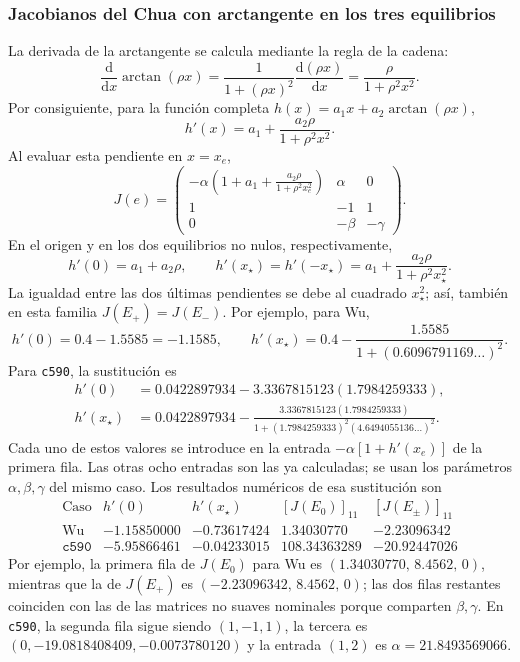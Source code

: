 \subsubsection{Jacobianos del Chua con arctangente en los tres equilibrios}

La derivada de la arctangente se calcula mediante la regla de la cadena:
\[
\frac{\mathrm d}{\mathrm dx}\arctan(\rho x)
=\frac{1}{1+(\rho x)^2}\frac{\mathrm d(\rho x)}{\mathrm dx}
=\frac{\rho}{1+\rho^2x^2}.
\]
Por consiguiente, para la función completa \(h(x)=a_1x+a_2\arctan(\rho x)\),
\[
h'(x)=a_1+\frac{a_2\rho}{1+\rho^2x^2}.
\]
Al evaluar esta pendiente en \(x=x_e\),
\begin{equation}
J(e)=
\begin{pmatrix}
\displaystyle
-\alpha\left(1+a_1+
\frac{a_2\rho}{1+\rho^2x_e^2}\right)
&\alpha&0\\[3mm]
1&-1&1\\
0&-\beta&-\gamma
\end{pmatrix}.
\label{eq:jacobiano_arctan}
\end{equation}
En el origen y en los dos equilibrios no nulos, respectivamente,
\[
h'(0)=a_1+a_2\rho,
\qquad
h'(x_\star)=h'(-x_\star)
=a_1+\frac{a_2\rho}{1+\rho^2x_\star^2}.
\]
La igualdad entre las dos últimas pendientes se debe al cuadrado
\(x_\star^2\); así, también en esta familia \(J(E_+)=J(E_-)\).
Por ejemplo, para Wu,
\[
h'(0)=0.4-1.5585=-1.1585,
\qquad
h'(x_\star)=0.4-
\frac{1.5585}{1+(0.6096791169\ldots)^2}.
\]
Para \texttt{c590}, la sustitución es
\[
\begin{aligned}
h'(0)&=0.0422897934-3.3367815123(1.7984259333),\\
h'(x_\star)&=0.0422897934-
\frac{3.3367815123(1.7984259333)}
{1+(1.7984259333)^2(4.6494055136\ldots)^2}.
\end{aligned}
\]
Cada uno de estos valores se introduce en la entrada
\(-\alpha[1+h'(x_e)]\) de la primera fila. Las otras ocho entradas son las
ya calculadas; se usan los parámetros \(\alpha,\beta,\gamma\) del mismo
caso. Los resultados numéricos de esa sustitución son
\[
\begin{array}{c|rrrr}
\text{Caso}&h'(0)&h'(x_\star)&[J(E_0)]_{11}&[J(E_\pm)]_{11}\\ \hline
\text{Wu}&-1.15850000&-0.73617424&1.34030770&-2.23096342\\
\texttt{c590}&-5.95866461&-0.04233015&108.34363289&-20.92447026
\end{array}
\]
Por ejemplo, la primera fila de \(J(E_0)\) para Wu es
\((1.34030770,\,8.4562,\,0)\), mientras que la de \(J(E_+)\) es
\((-2.23096342,\,8.4562,\,0)\); las dos filas restantes coinciden con las
de las matrices no suaves nominales porque comparten \(\beta,\gamma\).
En \texttt{c590}, la segunda fila sigue siendo \((1,-1,1)\), la tercera
es \((0,-19.0818408409,-0.0073780120)\) y la entrada \((1,2)\) es
\(\alpha=21.8493569066\).

